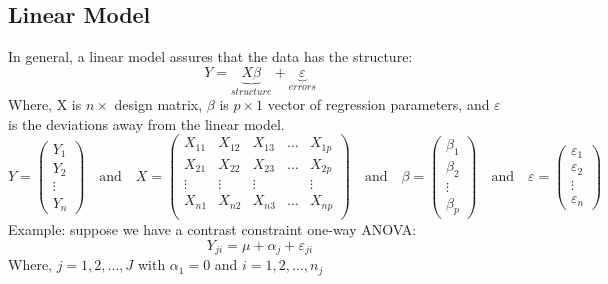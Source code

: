 \documentclass[12pt ]{article}
\begin{document}
\subsection{Linear Model}
In general, a linear model assures that the data has the structure:
\begin{equation*}
Y = \underbrace{X\beta}_{structure} + \underbrace{\varepsilon}_{errors}
\end{equation*}
Where, X is $n\times $ design matrix, $\beta$ is $p \times 1$ vector of regression parameters, and $\varepsilon$ is the deviations away from the linear model.
\begin{equation*}
    Y = \begin{pmatrix}
           Y_{1} \\
           Y_{2} \\
           \vdots \\
           Y_{n}
         \end{pmatrix}
         \quad\text{and}\quad
         X = \begin{pmatrix}
           X_{11}  & X_{12} & X_{13} & \dots & X_{1p}\\
           X_{21}  & X_{22} & X_{23} & \dots & X_{2p}\\
           \vdots & \vdots &  \vdots&  &\vdots\\
           X_{n1}  & X_{n2} & X_{n3} & \dots & X_{np}\\
         \end{pmatrix}    
	\quad\text{and}\quad
    \beta = \begin{pmatrix}
           \beta_{1} \\
           \beta_{2} \\
           \vdots \\
           \beta_{p}
         \end{pmatrix}
         \quad\text{and}\quad
      \varepsilon = \begin{pmatrix}
           \varepsilon_{1} \\
           \varepsilon_{2} \\
           \vdots \\
           \varepsilon_{n}
         \end{pmatrix}
\end{equation*}
Example: suppose we have a contrast constraint one-way ANOVA:
\begin{equation*}
Y_{ji} = \mu + \alpha_{j} + \varepsilon_{ji}
\end{equation*}
Where, $j = 1, 2, \ldots, J$ with $\alpha_{1} = 0$ and $i = 1, 2, \ldots, n_{j}$ \\
\end{document}
